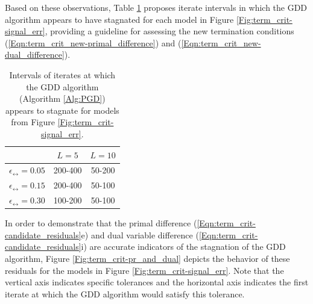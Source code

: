 Based on these observations, Table \ref{Tab:term_crit-desired_termination_windows} proposes iterate intervals in which the GDD algorithm appears to have stagnated for each model in Figure \ref{Fig:term_crit-signal_err}, providing a guideline for assessing the new termination conditions (\ref{Eqn:term_crit_new-primal_difference}) and (\ref{Eqn:term_crit_new-dual_difference}).
\begin{table}[H]
\centering
\begin{tabular}{ |c|c|c| }
\hline
&	$L = 5$
	&	$L = 10$	\\
 \hline
$\epsilon_\rel = 0.05$
&     200-400 &   50-200 		\\
 \hline
$\epsilon_\rel = 0.15$
&  200-400 &  50-100 	\\
 \hline
$\epsilon_\rel = 0.30$
&  100-200 &  50-100	\\
 \hline
\end{tabular}
\vspace{0.5cm}
\caption{Intervals of iterates at which the GDD algorithm (Algorithm \ref{Alg:PGD}) appears to stagnate for models from Figure \ref{Fig:term_crit-signal_err}.}
	\label{Tab:term_crit-desired_termination_windows}
\end{table}







In order to demonstrate that the primal difference (\ref{Eqn:term_crit-candidate_residuals}e) and dual variable difference (\ref{Eqn:term_crit-candidate_residuals}i) are accurate indicators of the stagnation of the GDD algorithm, Figure \ref{Fig:term_crit-pr_and_dual} depicts the behavior of these residuals for the models in Figure \ref{Fig:term_crit-signal_err}.  
Note that the vertical axis indicates specific tolerances and the horizontal axis indicates the first iterate at which the GDD algorithm would satisfy this tolerance.


